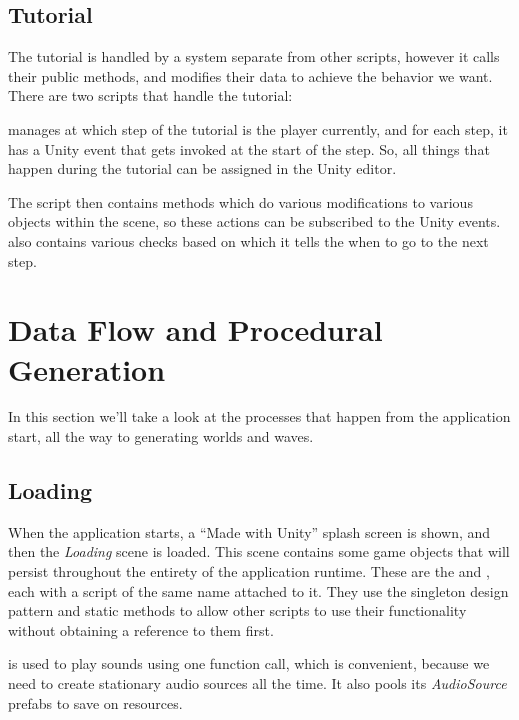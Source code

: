 \subsection{Tutorial}

The tutorial is handled by a system separate from other scripts, however it calls their public methods, and modifies their data to achieve the behavior we want.
There are two scripts that handle the tutorial:

 manages at which step of the tutorial is the player currently, and for each step, it has a Unity event that gets invoked at the start of the step.
So, all things that happen during the tutorial can be assigned in the Unity editor.

The script  then contains methods which do various modifications to various objects within the scene, so these actions can be subscribed to the  Unity events.
 also contains various checks based on which it tells the  when to go to the next step.

\section{Data Flow and Procedural Generation}\label{sec:docs-data}

In this section we'll take a look at the processes that happen from the application start, all the way to generating worlds and waves.

\subsection{Loading}

When the application starts, a \enquote{Made with Unity} splash screen is shown, and then the \emph{Loading} scene is loaded.
This scene contains some game objects that will persist throughout the entirety of the application runtime.
These are the  and , each with a script of the same name attached to it.
They use the singleton design pattern and static methods to allow other scripts to use their functionality without obtaining a reference to them first.

 is used to play sounds using one function call, which is convenient, because we need to create stationary audio sources all the time.
It also pools its \emph{AudioSource} prefabs to save on resources.

